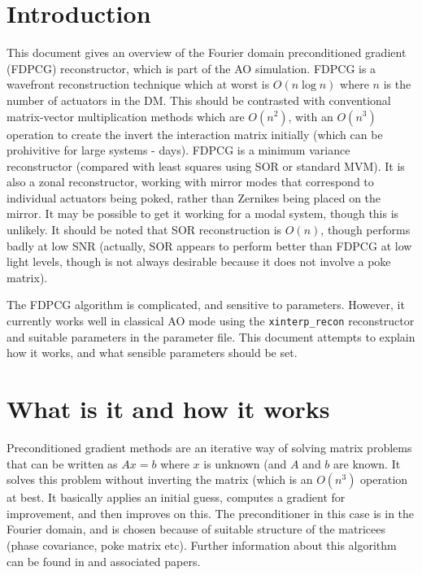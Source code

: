\documentclass{article}
\begin{document}

\renewcommand{\dasptitle}{FDPCG reconstruction}
\renewcommand{\daspdocno}{AOSIM-PCG-UoD-001}
\renewcommand{\releasedate}{070329}

\section{Introduction}
This document gives an overview of the Fourier domain preconditioned
gradient (FDPCG) reconstructor, which is part of the AO simulation.
FDPCG is a wavefront reconstruction technique which at worst is $O(n
\log n)$ where $n$ is the number of actuators in the DM.  This should
be contrasted with conventional matrix-vector multiplication methods
which are $O(n^2)$, with an $O(n^3)$ operation to create the invert
the interaction matrix initially (which can be prohivitive for large
systems - days).  FDPCG is a minimum variance reconstructor (compared
with least squares using SOR or standard MVM).  It is also a zonal
reconstructor, working with mirror modes that correspond to individual
actuators being poked, rather than Zernikes being placed on the
mirror.  It may be possible to get it working for a modal system,
though this is unlikely.  It should be noted that SOR reconstruction
is $O(n)$, though performs badly at low SNR (actually, SOR appears to
perform better than FDPCG at low light levels, though is not always
desirable because it does not involve a poke matrix).

The FDPCG algorithm is complicated, and sensitive to parameters.
However, it currently works well in classical AO mode using the
\texttt{xinterp\_recon} reconstructor and suitable parameters in the
parameter file.  This document attempts to explain how it works, and
what sensible parameters should be set.

\section{What is it and how it works}
Preconditioned gradient methods are an iterative way of solving matrix
problems that can be written as $Ax=b$ where $x$ is unknown (and $A$
and $b$ are known.  It solves this problem without inverting the
matrix (which is an $O(n^3)$ operation at best.  It basically applies
an initial guess, computes a gradient for improvement, and then
improves on this.  The preconditioner in this case is in the Fourier
domain, and is chosen because of suitable structure of the matricees
(phase covariance, poke matrix etc).  Further information about this
algorithm can be found in \citet{2006ApOpt..45.5281Y} and associated
papers. 
\end{document}
